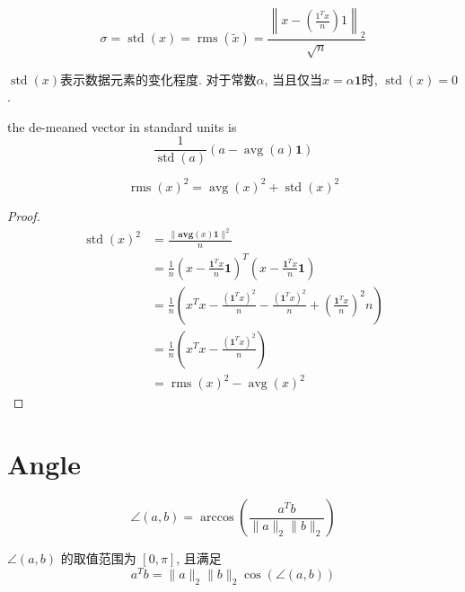 \begin{definition}[$x$的标准差]
    $$\sigma= \operatorname{std}(x)=\operatorname{rms}(\tilde{x})=\frac{\left\|x-\left( \frac{1^{T} x}{n} \right) 1\right\|_{2}}{\sqrt{n}} $$
\end{definition}

$\operatorname{std}(x)$表示数据元素的变化程度. 对于常数$\alpha$, 当且仅当$ x=\alpha \mathbf{1} $时, $ \operatorname{std}(x)=0 $.

\begin{corollary}
    the de-meaned vector in standard units is
$$
\frac{1}{\operatorname{std}(a)}(a-\operatorname{avg}(a) \mathbf{1})
$$
\end{corollary}

\begin{theorem}
    $$ \operatorname{rms}(x)^{2}=\operatorname{avg}(x)^{2}+\operatorname{std}(x)^{2} $$
\end{theorem}

\begin{proof}
    $$\displaystyle \begin{aligned}
        \operatorname{std} (x)^{2} & =\frac{\| \mathbf{avg} (x)\mathbf{1} \| ^{2}}{n}\\
         & =\frac{1}{n}\left( x-\frac{\mathbf{1}^{T} x}{n}\mathbf{1}\right)^{T}\left( x-\frac{\mathbf{1}^{T} x}{n}\mathbf{1}\right)\\
         & =\frac{1}{n}\left( x^{T} x-\frac{\left(\mathbf{1}^{T} x\right)^{2}}{n} -\frac{\left(\mathbf{1}^{T} x\right)^{2}}{n} +\left(\frac{\mathbf{1}^{T} x}{n}\right)^{2} n\right)\\
         & =\frac{1}{n}\left( x^{T} x-\frac{\left(\mathbf{1}^{T} x\right)^{2}}{n}\right)\\
         & =\operatorname{rms} (x)^{2} -\operatorname{avg} (x)^{2}
        \end{aligned}$$
\end{proof}

\section{Angle}

\begin{definition}
    $$ \angle(a, b)=\arccos \left(\frac{a^{T} b}{\|a\|_{2}\|b\|_{2}}\right) $$

    $ \angle(a, b) $ 的取值范围为 $ [0, \pi] $, 且满足$$ a^{T} b=\|a\|_{2}\|b\|_{2} \cos (\angle(a, b)) $$
\end{definition}

